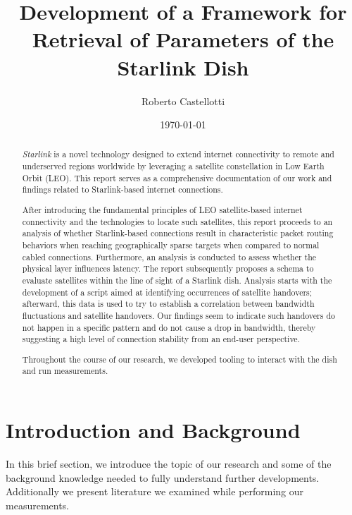 \documentclass[]{report}
\title{Development of a Framework for Retrieval of Parameters of the Starlink Dish}
\author{Roberto Castellotti}
\date{\today}
\begin{document}
\maketitle
\cleardoublepage


\begin{abstract} 

\textit{Starlink} is a novel technology designed to extend internet connectivity to remote and underserved regions
worldwide by leveraging a satellite constellation in Low Earth Orbit (LEO). This report serves as a comprehensive
documentation of our work and findings related to Starlink-based internet connections.

After introducing the fundamental principles of LEO satellite-based internet connectivity and the technologies to locate
such satellites, this report proceeds to an analysis of whether Starlink-based connections result in characteristic
packet routing behaviors when reaching geographically sparse targets when compared to normal cabled connections.
Furthermore, an analysis is conducted to assess whether the physical layer influences latency. The report
subsequently proposes a schema to evaluate satellites within the line of sight of a Starlink dish. Analysis starts
with the development of a script aimed at identifying occurrences of satellite handovers; afterward, this data is
used to try to establish a correlation between bandwidth fluctuations and satellite handovers. Our findings seem to
indicate such handovers do not happen in a specific pattern and do not cause a drop in bandwidth, thereby suggesting
a high level of connection stability from an end-user perspective.
    
Throughout the course of our research, we developed tooling to interact with the dish and run measurements.

\end{abstract}
    
\tableofcontents


\chapter{Introduction and Background}   

In this brief section, we introduce the topic of our research and some of the background knowledge needed to fully
understand further developments. Additionally we present literature we examined while performing our measurements.
\end{document}
